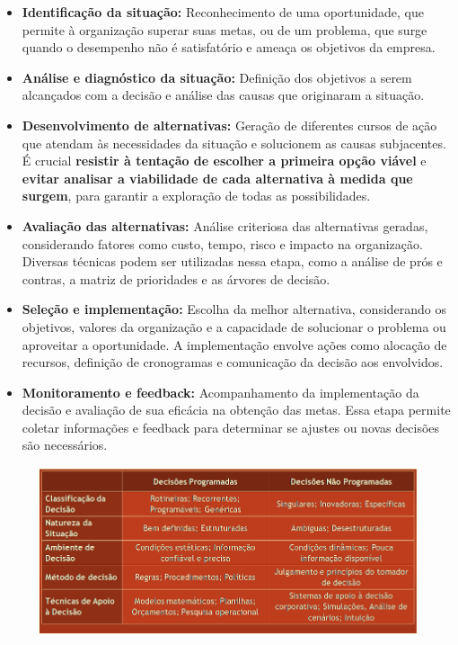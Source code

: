 \begin{itemize}
    \item \textbf{Identificação da situação:} Reconhecimento de uma oportunidade, que permite à organização superar suas metas, ou de um problema, que surge quando o desempenho não é satisfatório e ameaça os objetivos da empresa.
    \item \textbf{Análise e diagnóstico da situação:} Definição dos objetivos a serem alcançados com a decisão e análise das causas que originaram a situação.
    \item \textbf{Desenvolvimento de alternativas:} Geração de diferentes cursos de ação que atendam às necessidades da situação e solucionem as causas subjacentes. É crucial \textbf{resistir à tentação de escolher a primeira opção viável} e \textbf{evitar analisar a viabilidade de cada alternativa à medida que surgem}, para garantir a exploração de todas as possibilidades.
    \item \textbf{Avaliação das alternativas:} Análise criteriosa das alternativas geradas, considerando fatores como custo, tempo, risco e impacto na organização. Diversas técnicas podem ser utilizadas nessa etapa, como a análise de prós e contras, a matriz de prioridades e as árvores de decisão.
    \item \textbf{Seleção e implementação:} Escolha da melhor alternativa, considerando os objetivos, valores da organização e a capacidade de solucionar o problema ou aproveitar a oportunidade. A implementação envolve ações como alocação de recursos, definição de cronogramas e comunicação da decisão aos envolvidos.
    \item \textbf{Monitoramento e feedback:} Acompanhamento da implementação da decisão e avaliação de sua eficácia na obtenção das metas. Essa etapa permite coletar informações e feedback para determinar se ajustes ou novas decisões são necessários.
\end{itemize}

\begin{figure}[H]  %
    \centering
    \begin{minipage}{0.8\textwidth}
        \centering
        \includegraphics[width=\textwidth]{img/imagem6.png}
        \label{fig:exemplo}
    \end{minipage}
\end{figure}


